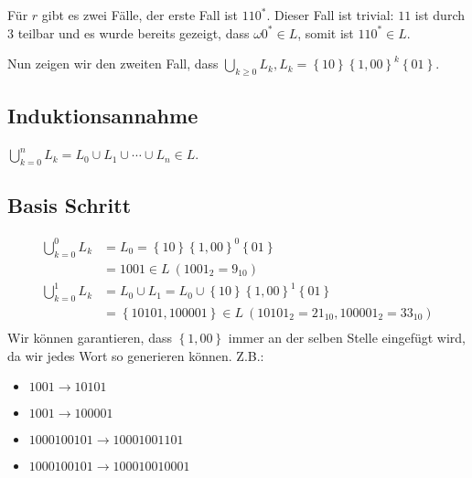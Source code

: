 \documentclass{article}
\begin{document}
\bigskip

Für $r$ gibt es zwei Fälle, der erste Fall ist $110^*$. Dieser Fall ist trivial: $11$ ist durch $3$ teilbar und es wurde bereits gezeigt, dass $\omega 0^* \in L$, somit ist $110^* \in L$.

\bigskip

Nun zeigen wir den zweiten Fall, dass $\bigcup_{k\geq 0} L_k, L_k = \left\{10\right\}\left\{1,00\right\}^k\left\{01\right\}$.

\subsection*{Induktionsannahme}
$\bigcup_{k=0}^n L_k = L_0 \cup L_1 \cup \cdots \cup L_n \in L$.

\subsection*{Basis Schritt}
\begin{align*}
\bigcup_{k=0}^0 L_k &= L_0 = \left\{10\right\}\left\{1,00\right\}^0\left\{01\right\} \\
                        &= 1001 \in L\ (1001_2 = 9_{10}) \\
\bigcup_{k=0}^1 L_k &= L_0 \cup L_1 = L_0 \cup \left\{10\right\}\left\{1,00\right\}^1\left\{01\right\} \\
                        &= \left\{10101,100001\right\} \in L\ (10101_2 = 21_{10}, 100001_2 = 33_{10}) \\
\end{align*}
Wir können garantieren, dass $\left\{1,00\right\}$ immer an der selben Stelle eingefügt wird, da wir jedes Wort so generieren können. Z.B.:
\begin{itemize}
	\item $1001 \rightarrow 10101$
	\item $1001 \rightarrow 100001$
	\item $1000100101 \rightarrow 10001001101$
	\item $1000100101 \rightarrow 100010010001$
\end{itemize}
\end{document}
